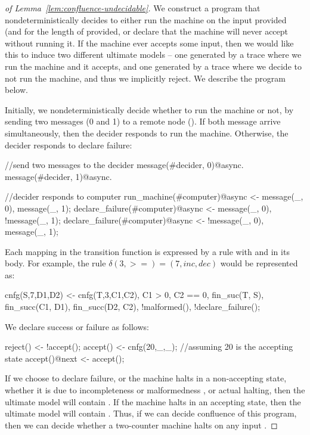 \begin{proof}[of Lemma~\ref{lem:confluence-undecidable}]
We construct a \lang program that nondeterministically decides to either run the machine on the input provided (and for the length of  provided, or declare that the machine will never accept without running it.  If the machine ever accepts some input, then we would like this to induce two different ultimate models -- one generated by a trace where we run the machine and it accepts, and one generated by a trace where we decide to not run the machine, and thus we implicitly reject.  We describe the program below. 

Initially, we nondeterministically decide whether to run the machine or not, by sending two messages (0 and 1) to a remote node ().  If both message arrive simultaneously, then the decider responds to run the machine.  Otherwise, the decider responds to declare failure:

\begin{Dedalus}
//send two messages to the decider
message(#decider, 0)@async.
message(#decider, 1)@async.

//decider responds to computer
run_machine(#computer)@async <- message(_, 0), message(_, 1);
declare_failure(#computer)@async <- message(_, 0), !message(_, 1);
declare_failure(#computer)@async <- !message(_, 0), message(_, 1);
\end{Dedalus}

Each mapping in the transition function is expressed by a \lang rule with  and  in its body.  For example, the rule $\delta(3, > =) = (7, inc, dec)$ would be represented as:

\begin{Dedalus}
cnfg(S,7,D1,D2) <- cnfg(T,3,C1,C2), C1 > 0, C2 == 0, fin_suc(T, S), fin_succ(C1, D1), fin_succ(D2, C2), !malformed(), !declare_failure();
\end{Dedalus}

We declare success or failure as follows:

\begin{Dedalus}
reject() <- !accept();
accept() <- cnfg(20,_,_); //assuming 20 is the accepting state
accept()@next <- accept();
\end{Dedalus}

If we choose to declare failure, or the machine halts in a non-accepting state, whether it is due to incompleteness or malformedness , or actual halting, then the ultimate model will contain .  If the machine halts in an accepting state, then the ultimate model will contain .  Thus, if we can decide confluence of this program, then we can decide whether a two-counter machine halts on any input .
\end{proof}
